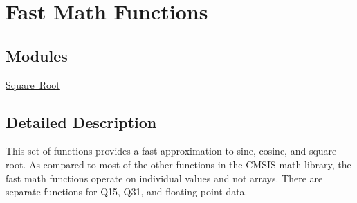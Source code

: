 \hypertarget{group__group_fast_math}{}\section{Fast Math Functions}
\label{group__group_fast_math}
\subsection*{Modules}
\begin{DoxyCompactItemize}
\item 
\mbox{\hyperlink{group___s_q_r_t}{Square Root}}
\end{DoxyCompactItemize}


\subsection{Detailed Description}
This set of functions provides a fast approximation to sine, cosine, and square root. As compared to most of the other functions in the C\+M\+S\+IS math library, the fast math functions operate on individual values and not arrays. There are separate functions for Q15, Q31, and floating-\/point data. 